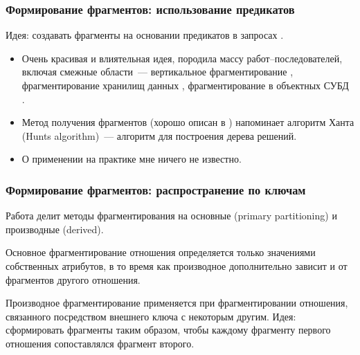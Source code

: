 \documentclass[unicode]{beamer}
\begin{document}
\begin{frame}
\frametitle{Формирование фрагментов: использование предикатов}

\begin{block}{}
Идея: создавать фрагменты на основании предикатов в запросах \cite{p22, p23}.
\end{block}

\begin{itemize}
  \setlength\itemsep{1em}	
  \item Очень красивая и влиятельная идея, породила массу работ--последователей, включая смежные области~--- вертикальное фрагментирование \cite{p24}, фрагментирование хранилищ данных \cite{p25}, фрагментирование в объектных СУБД \cite{p26}.

  \item Метод получения фрагментов (хорошо описан в \cite{p15}) напоминает алгоритм Ханта (Hunts algorithm)~--- алгоритм для построения дерева решений.

  \item О применении на практике мне ничего не известно.

\end{itemize}

\end{frame}

\begin{frame}
\frametitle{Формирование фрагментов: распространение по ключам}

\begin{block}{}
Работа \cite{p23} делит методы фрагментирования на основные (primary partitioning)  и производные (derived).
\end{block}

\begin{block}{}
Основное фрагментирование отношения определяется только значениями собственных атрибутов, в то время как производное дополнительно зависит и от фрагментов другого отношения. 
\end{block}

\begin{block}{}
Производное фрагментирование применяется при фрагментировании отношения, связанного посредством внешнего ключа с некоторым другим. Идея: сформировать фрагменты таким образом, чтобы каждому фрагменту первого отношения сопоставлялся фрагмент второго. 
\end{block}

\end{frame}
\end{document}
